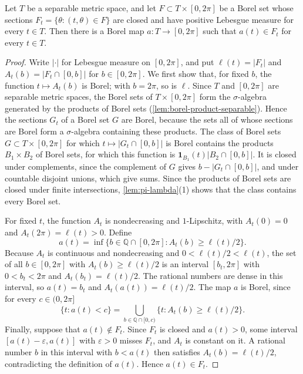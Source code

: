 \begin{lemma}\label{lem:positive-circle-selection}
Let $T$ be a separable metric space, and let $F\subset T\times[0,2\pi]$ be a Borel set whose sections $F_t=\{\theta:(t,\theta)\in F\}$ are closed and have positive Lebesgue measure for every $t\in T$. Then there is a Borel map $a\colon T\to[0,2\pi]$ such that $a(t)\in F_t$ for every $t\in T$.
\end{lemma}
\begin{proof}
Write $|\cdot|$ for Lebesgue measure on $[0,2\pi]$, and put $\ell(t)=|F_t|$ and $A_t(b)=|F_t\cap[0,b]|$ for $b\in[0,2\pi]$. We first show that, for fixed $b$, the function $t\mapsto A_t(b)$ is Borel; with $b=2\pi$, so is $\ell$. Since $T$ and $[0,2\pi]$ are separable metric spaces, the Borel sets of $T\times[0,2\pi]$ form the $\sigma$-algebra generated by the products of Borel sets (\cref{lem:borel-product-separable}). Hence the sections $G_t$ of a Borel set $G$ are Borel, because the sets all of whose sections are Borel form a $\sigma$-algebra containing these products. The class of Borel sets $G\subset T\times[0,2\pi]$ for which $t\mapsto|G_t\cap[0,b]|$ is Borel contains the products $B_1\times B_2$ of Borel sets, for which this function is $\mathbf1_{B_1}(t)|B_2\cap[0,b]|$. It is closed under complements, since the complement of $G$ gives $b-|G_t\cap[0,b]|$, and under countable disjoint unions, which give sums. Since the products of Borel sets are closed under finite intersections, \cref{lem:pi-lambda}(1) shows that the class contains every Borel set.

For fixed $t$, the function $A_t$ is nondecreasing and $1$-Lipschitz, with $A_t(0)=0$ and $A_t(2\pi)=\ell(t)>0$. Define
\[
 a(t)=\inf\{b\in\mathbb Q\cap[0,2\pi]:A_t(b)\geq\ell(t)/2\}.
\]
Because $A_t$ is continuous and nondecreasing and $0<\ell(t)/2<\ell(t)$, the set of all $b\in[0,2\pi]$ with $A_t(b)\geq\ell(t)/2$ is an interval $[b_t,2\pi]$ with $0<b_t<2\pi$ and $A_t(b_t)=\ell(t)/2$. The rational numbers are dense in this interval, so $a(t)=b_t$ and $A_t(a(t))=\ell(t)/2$. The map $a$ is Borel, since for every $c\in(0,2\pi]$
\[
 \{t:a(t)<c\}=\bigcup_{b\in\mathbb Q\cap[0,c)}\{t:A_t(b)\geq\ell(t)/2\}.
\]
Finally, suppose that $a(t)\notin F_t$. Since $F_t$ is closed and $a(t)>0$, some interval $[a(t)-\varepsilon,a(t)]$ with $\varepsilon>0$ misses $F_t$, and $A_t$ is constant on it. A rational number $b$ in this interval with $b<a(t)$ then satisfies $A_t(b)=\ell(t)/2$, contradicting the definition of $a(t)$. Hence $a(t)\in F_t$.
\end{proof}

